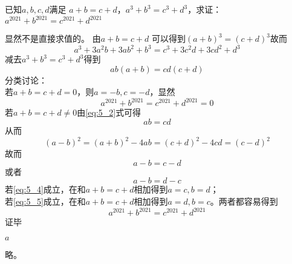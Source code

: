 \documentclass[windows,csize4,answers]{BHCexam}
\begin{document}
\begin{groups}
\begin{questions}[]
        \question[5] 已知$a,b,c,d$满足 $a+b=c+d$，$a^3+b^3=c^3+d^3$，求证：$a^{2021}+b^{2021}=c^{2021}+d^{2021}$
        \begin{solution}{0.5cm}
            \methodonly 显然不是直接求值的。
            由$a+b=c+d$ 可以得到$(a+b)^3=(c+d)^3$故而
            \begin{equation}
                \label{eq:5_1}
                a^3+3a^2b+3ab^2+b^3=c^3+3c^2d+3cd^2+d^3
            \end{equation}
            减去$a^3+b^3=c^3+d^3$得到
            \begin{equation}
                \label{eq:5_2}
                ab(a+b)=cd(c+d)
            \end{equation}
            分类讨论： \\
            若$a+b=c+d=0$，则$a=-b,c=-d$，显然
            \[
                a^{2021}+b^{2021}=c^{2021}+d^{2021}=0
            \]
            若$a+b=c+d\neq 0$由\ref{eq:5_2}式可得
            \begin{equation}
                \label{eq:5_3}
                ab=cd
            \end{equation}
            从而
            \[
                (a-b)^2=(a+b)^2-4ab=(c+d)^2-4cd=(c-d)^2
            \]
            故而
            \begin{equation}
                \label{eq:5_4}
                a-b=c-d
            \end{equation}
            或者
            \begin{equation}
                \label{eq:5_5}
                a-b=d-c
            \end{equation}
            若\ref{eq:5_4}成立，在和$a+b=c+d$相加得到$a=c,b=d$； \\
            若\ref{eq:5_5}成立，在和$a+b=c+d$相加得到$a=d,b=c$。两者都容易得到
            \[
                a^{2021}+b^{2021}=c^{2021}+d^{2021}
            \]
            证毕
        \end{solution}
        \vspace{3.5cm}







        \question[5]  $a$
        \begin{solution}{0.5cm}
            \methodonly 略。
        \end{solution}
        \vspace{3.5cm}



    \end{questions}
\end{groups}



\label{lastpage}
\end{document}
